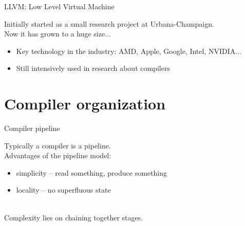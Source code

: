 \documentclass[10pt,mathserif]{beamer}
\begin{document}
\begin{frame}{LLVM: Low Level Virtual Machine}
\begin{center}
Initially started as a small research project at Urbana-Champaign.\\
\medskip
Now it has grown to a huge size...
\end{center}

\begin{itemize}
\item Key technology in the \alert{industry}: AMD, Apple, Google, Intel, NVIDIA...
\item Still intensively used in \alert{research} about compilers
\end{itemize}
\end{frame}




\section{Compiler organization}
\begin{frame}{Compiler pipeline}
\begin{center}
Typically a compiler is a \alert{pipeline}.\\
\bigskip
Advantages of the pipeline model:\\
\medskip
\begin{varwidth}{0.8\textwidth}
\begin{itemize}
\item \alert{simplicity} -- read something, produce something
\item \alert{locality} -- no superfluous state
\end{itemize}
\end{varwidth}
\\
\bigskip
Complexity lies on \alert{chaining} together stages.
\end{center}
\end{frame}
\end{document}
